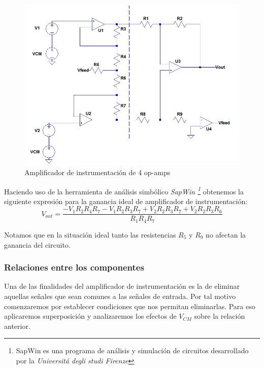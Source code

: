 	\begin{figure}[H]
		\centering
		\includegraphics[width=\linewidth]{./ImagenesVarias/inAmpSch.png}
		\caption{Amplificador de instrumentación de 4 op-amps}
	\end{figure}

	Haciendo uso de la herramienta de análisis simbólico \textit{SapWin \footnote{SapWin es una programa de análisis y simulación de circuitos desarrollado por la \textit{Universitá degli studi Firenze}}} obtenemos la siguiente expresión para la ganancia ideal de amplificador de instrumentación:
	\begin{equation}
			V_{out}=\frac{-V_1 R_2 R_4 R_7 - 
			V_1 R_2 R_3 R_7 +
			V_2 R_2 R_3 R_7+
			V_2 R_2 R_3 R_6
		}{R_1 R_4 R_7}
		\label{eqn:idealTrans}
	\end{equation}

	
	Notamos que en la situación ideal tanto las resistencias $R_5$ y $R_9$ no afectan la ganancia del circuito.
	\subsubsection{Relaciones entre los componentes}
	Una de las finalidades del amplificador de instrumentación es la de eliminar aquellas señales que sean comunes a las señales de entrada.
	Por tal motivo comenzaremos por establecer condiciones que nos permitan eliminarlas. 
	Para eso aplicaremos superposición y analizaremos los efectos de $V_{CM}$ sobre la relación anterior.
	
